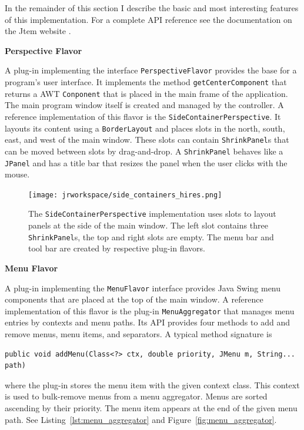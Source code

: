 \documentclass[Thesis.tex]{subfiles}
\begin{document}
In the remainder of this section I describe the basic and most interesting features of this 
implementation. For a complete API reference see the documentation on the {\sc Jtem} website 
\cite{JtemWebsite}.


{\bf Perspective Flavor}

A plug-in implementing the interface {\tt PerspectiveFlavor} provides the base for a program's user 
interface. It implements the method {\tt getCenterComponent} that returns a AWT {\tt Conponent}
that is placed in the main frame of the application. The main program window itself is created and
managed by the controller.
A reference implementation of this flavor is the {\tt SideContainerPerspective}. It layouts its content 
using a {\tt BorderLayout} and places slots in the north, south, east, and west of the main window. These
slots can contain {\tt ShrinkPanel}s that can be moved between slots by drag-and-drop. A {\tt ShrinkPanel}
behaves like a {\tt JPanel} and has a title bar that resizes the panel when the user clicks with the mouse.

\begin{figure}[H]
\centering
\texttt{[image: jrworkspace/side\_containers\_hires.png]}
\caption[The {\tt SideContainerPerspective} user interface plug-in]{The {\tt SideContainerPerspective} implementation uses slots to layout panels at the side of the
main window. The left slot contains three {\tt ShrinkPanel}s, the top and right slots are empty. The menu bar 
and tool bar are created by respective plug-in flavors.}
\label{fig:side_containers}
\end{figure}


{\bf Menu Flavor}

A plug-in implementing the {\tt MenuFlavor} interface provides {\sc Java Swing\TReg} menu 
components that are placed at the top of the main window. A reference implementation of this
flavor is the plug-in {\tt MenuAggregator} that manages menu entries by contexts and
menu paths. Its API provides four methods to add and remove menus, menu items, and
separators. A typical method signature is

\begin{lstlisting}[numbers=none]
	public void addMenu(Class<?> ctx, double priority, JMenu m, String... path)
\end{lstlisting}

where the plug-in stores the menu item with the given context class. This context is used to
bulk-remove menus from a menu aggregator. Menus are sorted ascending
by their priority. The menu item appears at the end of the given menu path. See 
Listing~\ref{lst:menu_aggregator} and Figure~\ref{fig:menu_aggregator}.
\end{document}
